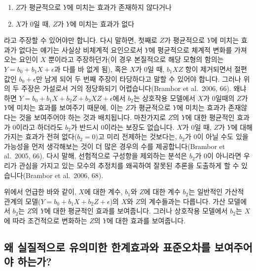 \documentclass[
]{book}
\begin{document}
\begin{enumerate}
\def\labelenumi{\arabic{enumi}.}
\item
  \(Z\)가 평균적으로 \(Y\)에 미치는 효과가 존재하지 않다거나
\item
  \(X\)가 0일 때, \(Z\)가 \(Y\)에 미치는 효과가 없다
\end{enumerate}

라고 주장할 수 있어야만 합니다. 다시 말하면, 첫째로 \(Z\)가 평균적으로 \(Y\)에 미치는 효과가 없다는 얘기는 사실상 비체계적 요인으로서 \(Y\)에 평균적으로 체계적 변화를 가져오는 요인이 \(X\) 뿐이라고 주장하던가(이 경우 본질적으로 해당 모형의 함의는 \(Y = b_0 + b_1X + \epsilon\)과 다를 바 없게 됨), 혹은 \(X\)가 0일 때, \(b_1XZ\) 항이 제거되면서 절편값인 \(b_0 + \epsilon\)만 남게 되어 두 번째 주장이 타당하다고 말할 수 있어야 합니다. 그러나 위의 두 주장은 가설로서 거의 정당화되기 어렵습니다(Brambor et al.~2006, 66). 왜냐하면 \(Y = b_0 + b_1X + b_2Z + b_3XZ + \epsilon\)에서 \(b_2\)는 상호작용 모델에서 \(X\)가 0일때의 \(Z\)가 \(Y\)에 미치는 효과를 보여주기 때문에, 이는 \(Z\)가 평균적으로 \(Y\)에 미치는 효과가 존재않다는 것을 보여주어야 하는 것과 배치됩니다. 마찬가지로 \(Z\)의 \(Y\)에 대한 평균적인 효과가 0이라고 하더라도 \(b_2\)가 반드시 0이라는 보장도 없습니다. \(X\)가 0일 때, \(Z\)가 \(Y\)에 대해 가지는 효과가 전혀 없다(\(b_2 = 0\))고 미리 전제하는 것보다는, \(b_2\)가 0이 아닐 수도 있을 가능성을 먼저 생각해보는 것이 더 많은 경우의 수를 제공합니다(Brambor et al.~2005, 66). 다시 말해, 선험적으로 구성항을 제외하는 분석은 \(b_2\)가 0이 아니라면 우리가 관심을 가지고 있는 모수의 추정치를 왜곡하여 잘못된 추론을 도출하게 할 수 있습니다(Brambor et al.~2006, 68).

위에서 언급한 바와 같이, \(X\)에 대한 계수, \(b_1\)와 \(Z\)에 대한 계수 \(b_2\)는 일반적인 가산적 관계의 모델(\(Y =b_0 + b_1X + b_2Z + \epsilon\))의 \(X\)와 \(Z\)의 계수들과는 다릅니다. 가산 모델에서 \(b_2\)는 \(Z\)의 \(Y\)에 대한 평균적인 효과를 보여줍니다. 그러나 상호작용 모델에서 \(b_2\)는 \(X\)에 따라 조건적으로 변화하는 \(Z\)의 \(Y\)에 대한 효과를 보여줍니다.

\hypertarget{uxc65c-uxc2e4uxc9c8uxc801uxc73cuxb85c-uxc720uxc758uxbbf8uxd55c-uxd55cuxacc4uxd6a8uxacfcuxc640-uxd45cuxc900uxc624uxcc28uxb97c-uxbcf4uxc5ecuxc8fcuxc5b4uxc57c-uxd558uxb294uxac00}{%
\subsection{왜 실질적으로 유의미한 한계효과와 표준오차를 보여주어야 하는가?}\label{uxc65c-uxc2e4uxc9c8uxc801uxc73cuxb85c-uxc720uxc758uxbbf8uxd55c-uxd55cuxacc4uxd6a8uxacfcuxc640-uxd45cuxc900uxc624uxcc28uxb97c-uxbcf4uxc5ecuxc8fcuxc5b4uxc57c-uxd558uxb294uxac00}}
\end{document}

